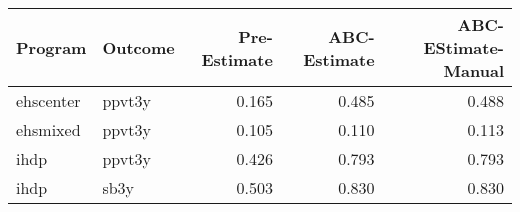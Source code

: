 \begin{table}[ht]
\centering
\begin{tabular}{llrrr}
  \hline
Program & Outcome & Pre-Estimate & ABC-Estimate & ABC-EStimate-Manual \\ 
  \hline
ehscenter & ppvt3y & 0.165 & 0.485 & 0.488 \\ 
  ehsmixed & ppvt3y & 0.105 & 0.110 & 0.113 \\ 
  ihdp & ppvt3y & 0.426 & 0.793 & 0.793 \\ 
  ihdp & sb3y & 0.503 & 0.830 & 0.830 \\ 
   \hline
\end{tabular}
\end{table}
